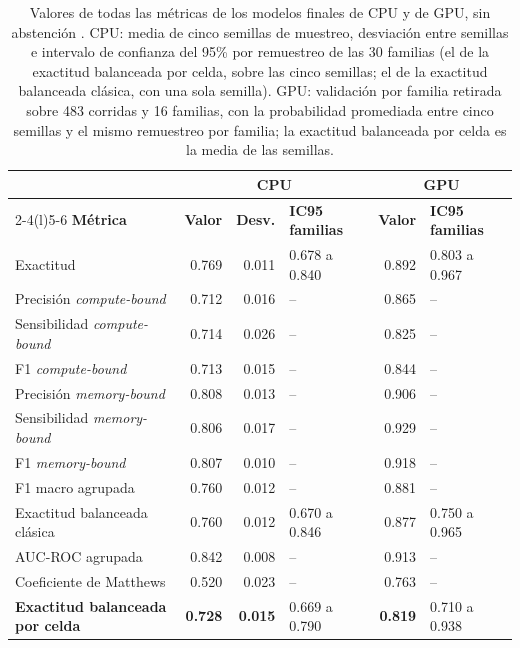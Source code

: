 \begin{table}[H]
\centering
\caption[Valores de todas las métricas de los modelos finales]{Valores de todas las métricas de los modelos finales de CPU y de GPU, sin abstención \cite{SokolovaLapalme2009,ChiccoJurman2020}. CPU: media de cinco semillas de muestreo, desviación entre semillas e intervalo de confianza del 95\% por remuestreo de las 30 familias (el de la exactitud balanceada por celda, sobre las cinco semillas; el de la exactitud balanceada clásica, con una sola semilla). GPU: validación por familia retirada sobre 483 corridas y 16 familias, con la probabilidad promediada entre cinco semillas y el mismo remuestreo por familia; la exactitud balanceada por celda es la media de las semillas.}
\label{tab:cpu-metricas-valores}
\small
\setlength{\tabcolsep}{3pt}
\begin{tabular}{@{}p{4.3cm}rrp{2.6cm}rp{2.6cm}@{}}
\toprule
 & \multicolumn{3}{c}{\textbf{CPU}} & \multicolumn{2}{c}{\textbf{GPU}} \\
\cmidrule(lr){2-4}\cmidrule(l){5-6}
\textbf{Métrica} & \textbf{Valor} & \textbf{Desv.} & \textbf{IC95 familias} & \textbf{Valor} & \textbf{IC95 familias} \\
\midrule
Exactitud & 0.769 & 0.011 & 0.678 a 0.840 & 0.892 & 0.803 a 0.967 \\
Precisión \textit{compute-bound} & 0.712 & 0.016 & -- & 0.865 & -- \\
Sensibilidad \textit{compute-bound} & 0.714 & 0.026 & -- & 0.825 & -- \\
F1 \textit{compute-bound} & 0.713 & 0.015 & -- & 0.844 & -- \\
Precisión \textit{memory-bound} & 0.808 & 0.013 & -- & 0.906 & -- \\
Sensibilidad \textit{memory-bound} & 0.806 & 0.017 & -- & 0.929 & -- \\
F1 \textit{memory-bound} & 0.807 & 0.010 & -- & 0.918 & -- \\
F1 macro agrupada & 0.760 & 0.012 & -- & 0.881 & -- \\
Exactitud balanceada clásica & 0.760 & 0.012 & 0.670 a 0.846 & 0.877 & 0.750 a 0.965 \\
AUC-ROC agrupada & 0.842 & 0.008 & -- & 0.913 & -- \\
Coeficiente de Matthews & 0.520 & 0.023 & -- & 0.763 & -- \\
\textbf{Exactitud balanceada por celda} & \textbf{0.728} & \textbf{0.015} & 0.669 a 0.790 & \textbf{0.819} & 0.710 a 0.938 \\
\bottomrule
\end{tabular}
\end{table}

